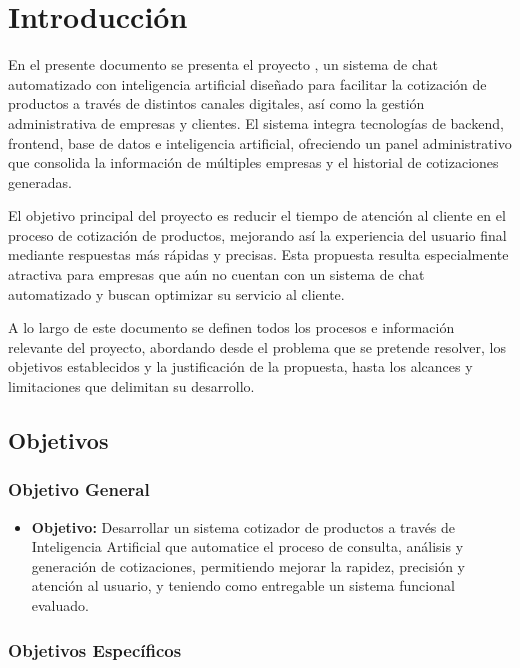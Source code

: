 \section{Introducción}
\label{ch:introduccion}

En el presente documento se presenta el proyecto  \textbf{\NombreProyecto}, un sistema de chat automatizado con inteligencia artificial diseñado para facilitar la cotización de productos a través de distintos canales digitales, así como la gestión administrativa de empresas y clientes. El sistema integra tecnologías de backend, frontend, base de datos e inteligencia artificial, ofreciendo un panel administrativo que consolida la información de múltiples empresas y el historial de cotizaciones generadas.

El objetivo principal del proyecto es reducir el tiempo de atención al cliente en el proceso de cotización de productos, mejorando así la experiencia del usuario final mediante respuestas más rápidas y precisas. Esta propuesta resulta especialmente atractiva para empresas que aún no cuentan con un sistema de chat automatizado y buscan optimizar su servicio al cliente.

A lo largo de este documento se definen todos los procesos e información relevante del proyecto, abordando desde el problema que se pretende resolver, los objetivos establecidos y la justificación de la propuesta, hasta los alcances y limitaciones que delimitan su desarrollo.

\subsection{Objetivos}
\label{sec:objetivos}

\subsubsection{Objetivo General}
\label{subsec:objetivo_general}

\begin{itemize}
    \item \textbf{Objetivo:} Desarrollar un sistema cotizador de productos a través de Inteligencia Artificial que automatice el proceso de consulta, análisis y generación de cotizaciones, permitiendo mejorar la rapidez, precisión y atención al usuario, y teniendo como entregable un sistema funcional evaluado.
\end{itemize}

\subsubsection{Objetivos Específicos}
\label{subsec:objetivos_especificos}

